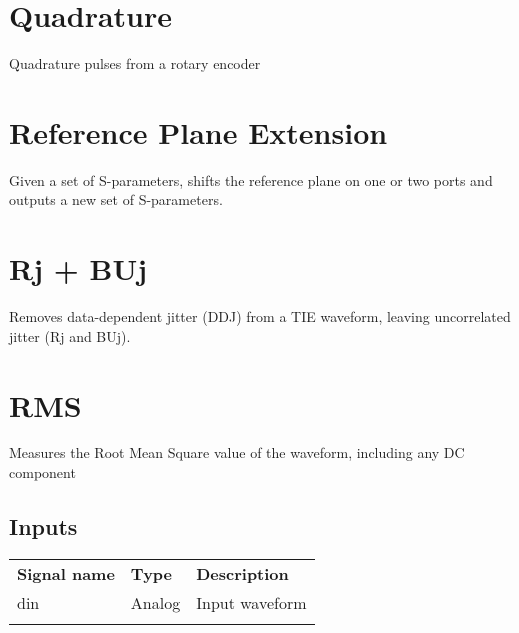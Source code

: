 \section{Quadrature}

Quadrature pulses from a rotary encoder

\pagebreak
\section{Reference Plane Extension}

Given a set of S-parameters, shifts the reference plane on one or two ports and outputs a new set of S-parameters.

\pagebreak
\section{Rj + BUj}

Removes data-dependent jitter (DDJ) from a TIE waveform, leaving uncorrelated jitter (Rj and BUj).

\pagebreak
\section{RMS}
\label{filter:rms}

Measures the Root Mean Square value of the waveform, including any DC component


\subsection{Inputs}

\begin{tabularx}{16cm}{llX}
\thickhline
\textbf{Signal name} & \textbf{Type} & \textbf{Description} \\
\thickhline
din & Analog & Input waveform \\
\thickhline
\end{tabularx}

